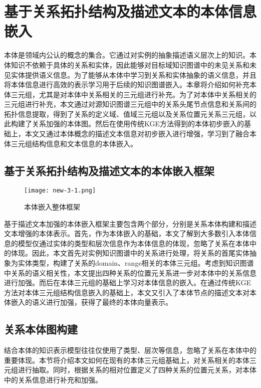 \chapter{基于关系拓扑结构及描述文本的本体信息嵌入}
本体是领域内公认的概念的集合。它通过对实例的抽象描述语义层次上的知识。本体知识不依赖于具体的关系和实体，因此能够对目标域知识图谱中的未见关系和未见实体提供语义信息。为了能够从本体中学习到关系和实体抽象的语义信息，并且将本体信息进行高效的表示学习用于后续的知识图谱嵌入。本章将介绍如何补充本体三元组，尤其是对本体中关系相关的三元组进行补充。为了对本体中关系相关的三元组进行补充，本文通过对源知识图谱三元组中的关系头尾节点信息和关系间的拓扑信息提取，得到了关系的定义域、值域三元组以及关系位置元关系三元组，以此构建了关系加强的本体图。然后在使用传统KGE方法得到的本体初步嵌入的基础上，本文又通过本体概念的描述文本信息对初步嵌入进行增强，学习到了融合本体三元组结构信息和文本信息的本体嵌入。

\section{基于关系拓扑结构及描述文本的本体嵌入框架}
\begin{figure}[h]
  \centering
  \texttt{[image: new-3-1.png]}
  \caption{本体嵌入整体框架}
  \label{fig:new-3-1}
\end{figure}

基于描述文本加强的本体嵌入框架主要包含两个部分，分别是关系本体构建和描述文本增强的本体表示。首先，作为本体嵌入的基础，本文了解到大多数引入本体信息的模型仅通过实体的类型和层次信息作为本体信息的体现，忽略了关系在本体中的体现。因此，本文首先对实例知识图谱中的关系进行处理，将关系的首尾实体抽象为实体类型，构建了关系的domain、range相关的本体三元组。考虑到知识图谱中关系的语义相关性，本文提出四种关系的位置元关系进一步对本体中的关系信息进行加强。而后在本体三元组的基础上学习对本体信息的嵌入。在通过传统KGE方法对本体三元组结构信息嵌入的基础上，本文又引入了本体节点的描述文本对本体嵌入的语义进行加强，获得了最终的本体向量表示。

\section{关系本体图构建}
结合本体的知识表示模型往往仅使用了类型、层次等信息，忽略了关系在本体中的重要体现。本节将介绍本文如何在现有的本体三元组基础上，对关系相关的本体三元组进行抽取。同时，根据关系的相对位置定义了四种关系的位置元关系，对本体中的关系信息进行补充和加强。

